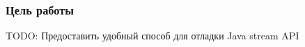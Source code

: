\begin{frame}
\frametitle{Цель работы} %
TODO: Предоставить удобный способ для отладки Java stream API
\end{frame}
